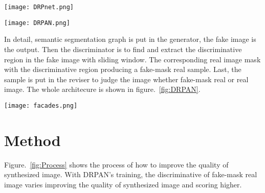 \documentclass[10pt,twocolumn,letterpaper]{article}
\begin{document}
\begin{figure*}
\begin{center}
   \texttt{[image: DRPnet.png]}
\end{center}
   \caption{\textbf{Left}: Their Discriminative Region Proposal network (DRPnet). \textbf{Right}: Synthesized samples compared with previous works on Cityscapes validation dataset~\cite{Cordts2016The}. The regions within red window show obvious artifacts or deformation. Their method can synthesize images with clear structure and vivid details.~\cite{Wang2017Discriminative}}
\label{fig:DRPnet}
\end{figure*}

\begin{figure*}
\begin{center}
   \texttt{[image: DRPAN.png]}
\end{center}
   \caption{The overall network architecture and data flow of our proposed Discriminative Region Proposal Adversarial Network (DRPAN), which is composed of three components: a generator, a discriminator, and a reviser, and is a unified model for image-to-image translation tasks.~\cite{Wang2017Discriminative}}
\label{fig:DRPAN}
\end{figure*}

In detail, semantic segmentation graph is put in the generator, the fake image is the output. Then the discriminator is to find and extract the discriminative region in the fake image with sliding window. The corresponding real image mask with the discriminative region producing a fake-mask real sample. Last, the sample is put in the reviser to judge the image whether fake-mask real or real image. The whole architecure is shown in figure.~\ref{fig:DRPAN}.

\begin{figure*}
\begin{center}
   \texttt{[image: facades.png]}
\end{center}
   \caption{The training process of DRPAN on facades dataset~\cite{Radim2013Spatial}. Left: The plotting curve shows mean value of score map on synthesized samples. Right: Step by step synthesis on different discriminative regions.~\cite{Wang2017Discriminative}}
\label{fig:Process}
\end{figure*}


\section{Method}
Figure.~\ref{fig:Process} shows the process of how to improve the quality of synthesized image. With DRPAN's training, the discriminative of fake-mask real image  varies improving the quality of synthesized image and scoring higher. 
\end{document}
